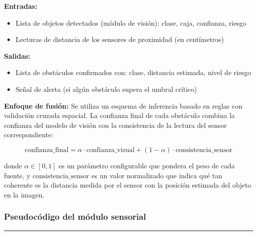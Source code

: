 \textbf{Entradas:}
\begin{itemize}
    \item Lista de objetos detectados (módulo de visión): clase, caja, confianza, riesgo
    \item Lecturas de distancia de los sensores de proximidad (en centímetros)
\end{itemize}

\textbf{Salidas:}
\begin{itemize}
    \item Lista de obstáculos confirmados con: clase, distancia estimada, nivel de riesgo
    \item Señal de alerta (si algún obstáculo supera el umbral crítico)
\end{itemize}

\textbf{Enfoque de fusión:}
Se utiliza un esquema de inferencia basado en reglas con validación cruzada espacial.
La confianza final de cada obstáculo combina la confianza del modelo de visión con la
consistencia de la lectura del sensor correspondiente:

\[
\text{confianza\_final} = \alpha \cdot \text{confianza\_visual} + (1 - \alpha) \cdot \text{consistencia\_sensor}
\]

donde $\alpha \in [0,1]$ es un parámetro configurable que pondera el peso de cada fuente,
y $\text{consistencia\_sensor}$ es un valor normalizado que indica qué tan coherente es la
distancia medida por el sensor con la posición estimada del objeto en la imagen.

\subsubsection{Pseudocódigo del módulo sensorial}

\begin{center}
\label{alg:sensor}
\end{center}
\vspace{-1.8cm}
\rule{\textwidth}{0.4pt}
\vspace{-0.9cm}

